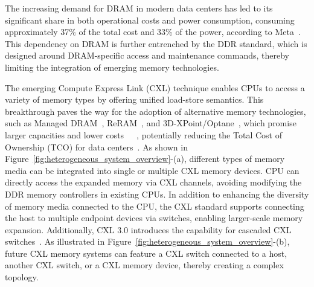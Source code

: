
The increasing demand for DRAM in modern data centers has led to its significant share in both operational costs and power consumption, consuming approximately 37\% of the total cost and 33\% of the power, according to Meta~\cite{tpp_asplos23}. This dependency on DRAM is further entrenched by the DDR standard, which is designed around DRAM-specific access and maintenance commands, thereby limiting the integration of emerging memory technologies.

The emerging Compute Express Link (CXL) technique enables CPUs to access a variety of memory types by offering unified load-store semantics. This breakthrough paves the way for the adoption of alternative memory technologies, such as Managed DRAM~\cite{LeeJKKKKHKMLJKL19}, ReRAM~\cite{chen2020reram}, and 3D-XPoint/Optane~\cite{hady2017platform}, which promise larger capacities and lower costs~\cite{Subramanya_eurosys16}~\cite{Eisenman2018ReducingDF}~\cite{Kassa_atc21}, potentially reducing the Total Cost of Ownership (TCO) for data centers~\cite{sharma2024introductioncomputeexpresslink}. As shown in Figure~\ref{fig:heterogeneous_system_overview}-(a), different types of memory media can be integrated into single or multiple CXL memory devices. CPU can directly access the expanded memory via CXL channels, avoiding modifying the DDR memory controllers in existing CPUs. 
In addition to enhancing the diversity of memory media connected to the CPU, the CXL standard supports connecting the host to multiple endpoint devices via switches, enabling larger-scale memory expansion.
Additionally, CXL 3.0 introduces the capability for cascaded CXL switches~\cite{cxl}. As illustrated in Figure~\ref{fig:heterogeneous_system_overview}-(b), future CXL memory systems can feature a CXL switch connected to a host, another CXL switch, or a CXL memory device, thereby creating a complex topology.


